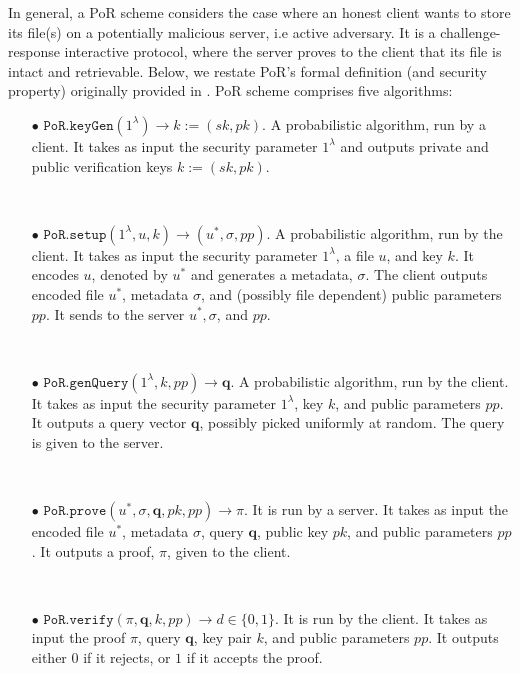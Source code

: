 
In general, a PoR scheme considers the case where an honest client wants to store its file(s) on a  potentially malicious server, i.e active adversary. It is a challenge-response interactive protocol, where the server proves to the client that its file is intact and retrievable. Below, we restate PoR's formal definition (and security property) originally provided in \cite{DBLP:journals/iacr/JuelsK07,DBLP:conf/asiacrypt/ShachamW08}. PoR scheme comprises five algorithms: 

\begin{itemize}
\item[$\bullet$] $\mathtt{PoR.keyGen}(1^{\scriptscriptstyle\lambda})\rightarrow k:=(sk,pk)$.  A probabilistic algorithm, run by a client. It takes as input the security parameter  $1^{\scriptscriptstyle\lambda}$ and outputs  private and public verification keys $k:=(sk,pk)$.

\

\item[$\bullet$] $\mathtt{PoR.setup}(1^{\scriptscriptstyle\lambda}, u,k)\rightarrow (u^{\scriptscriptstyle *}, \sigma, {pp})$. A probabilistic algorithm, run by the client. It takes as input the security parameter $1^{\scriptscriptstyle\lambda}$,  a file $u$, and key $k$. It encodes $u$, denoted by $u^{\scriptscriptstyle *}$ and generates  a metadata, $\sigma$.  The client outputs encoded file $u^{\scriptscriptstyle *}$, metadata $\sigma$, and  { (possibly file dependent) public parameters $pp$}. It sends to the server   $u^{\scriptscriptstyle *},\sigma$, and { $pp$}.

\

\item[$\bullet$] $\mathtt{PoR.genQuery}(1^{\scriptscriptstyle\lambda},k,{ pp})\rightarrow \bm{q}$. A probabilistic algorithm, run by the client. It takes as input the security parameter  $1^{\scriptscriptstyle\lambda}$,  key $k$, and {  public parameters $pp$}. It outputs a  query vector $\bm{q}$, possibly picked uniformly at random. The query is given to the server. 

\

\item[$\bullet$] $\mathtt{PoR.prove}(u^{\scriptscriptstyle *}, \sigma,\bm{q},pk,{ pp})\rightarrow \pi$. It is run by a server.  It takes as input the encoded file $u^{\scriptscriptstyle *}$, metadata $\sigma$, query $\bm{q}$,  public key $pk$, and {  public parameters $pp$}. It  outputs a proof, $\pi$, given to the client. 

\

\item[$\bullet$] $\mathtt{PoR.verify}(\pi,\bm{q},k,{ pp})\rightarrow d\in\{0,1\}$. It is run by the client. It takes as input the proof $\pi$,  query $\bm{q}$,  key pair $k$, and {  public parameters $pp$}. It outputs either $0$ if it rejects,  or $1$ if it accepts the proof. 

\end{itemize}



